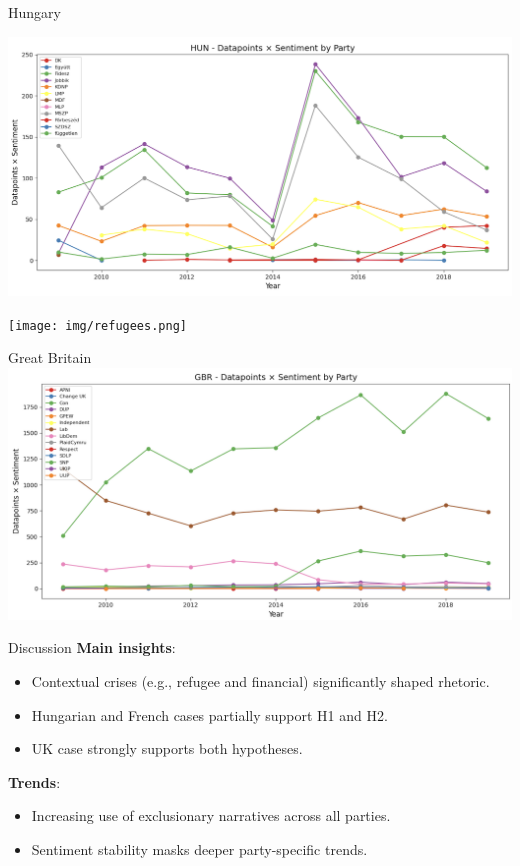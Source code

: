 \documentclass[8pt]{beamer}
\begin{document}
\begin{frame}{Hungary}

\includegraphics[width=\textwidth]{img/HUN.png}
    
\end{frame}

\begin{frame}{}
    \texttt{[image: img/refugees.png]}
\end{frame}

\begin{frame}{Great Britain}
    \includegraphics[width=\textwidth]{img/GBR.png}
\end{frame}

\begin{frame}{Discussion}
    \textbf{Main insights}:
    \begin{itemize}
        \item Contextual crises (e.g., refugee and financial) significantly shaped rhetoric.
\item  Hungarian and French cases partially support H1 and H2.
\item  UK case strongly supports both hypotheses.
    \end{itemize}
     \textbf{Trends}:
     \begin{itemize}
         \item Increasing use of exclusionary narratives across all parties.
\item  Sentiment stability masks deeper party-specific trends.
     \end{itemize}
\end{frame}
\end{document}
